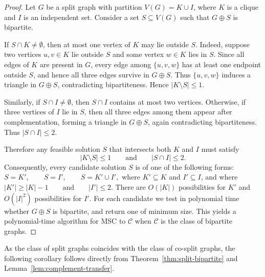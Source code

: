 \documentclass[11pt]{article}
\theoremstyle{definition}
\begin{document}
\begin{proof}
Let $G$ be a split graph with partition $V(G)=K\cup I$, where $K$ is a clique and $I$ is an independent set.  
Consider a set $S\subseteq V(G)$ such that $G\oplus S$ is bipartite.

If $S\cap K\neq\emptyset$, then at most one vertex of $K$ may lie outside $S$.  
Indeed, suppose two vertices $u,v\in K$ lie outside $S$ and some vertex $w\in K$ lies in $S$.  
Since all edges of $K$ are present in $G$, every edge among $\{u,v,w\}$ has at least one endpoint outside $S$, and hence all three edges survive in $G\oplus S$.  
Thus $\{u,v,w\}$ induces a triangle in $G\oplus S$, contradicting bipartiteness.  
Hence $|K\setminus S|\le 1$.

Similarly, if $S\cap I\neq\emptyset$, then $S\cap I$ contains at most two vertices.  
Otherwise, if three vertices of $I$ lie in $S$, then all three edges among them appear after complementation, forming a triangle in $G\oplus S$, again contradicting bipartiteness.  
Thus $|S\cap I|\le 2$.

Therefore any feasible solution $S$ that intersects both $K$ and $I$ must satisfy
\[
|K\setminus S|\le 1 
\qquad\text{and}\qquad
|S\cap I|\le 2.
\]
Consequently, every candidate solution $S$ is of one of the following forms:
$
S = K', \qquad
S = I', \qquad
S = K' \cup I',
$
where $K'\subseteq K$ and $I'\subseteq I$, and where
$
|K'|\ge |K|-1 
\qquad\text{and}\qquad 
|I'|\le 2.
$
There are $O(|K|)$ possibilities for $K'$ and $O(|I|^2)$ possibilities for $I'$.  
For each candidate we test in polynomial time whether $G\oplus S$ is bipartite, and return one of minimum size.  
This yields a polynomial-time algorithm for MSC to $\mathcal{C}$ when $\mathcal{C}$ is the class of bipartite graphs.

\end{proof}

As the class of split graphs coincides with the class of co-split graphs,
the following corollary follows directly from Theorem~\ref{thm:split-bipartite}
and Lemma~\ref{lem:complement-transfer}.
\end{document}

